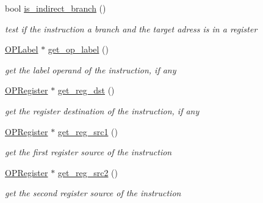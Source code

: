 \begin{DoxyCompactItemize}
\mbox{\label{class_instruction_affdf2382cd36277fb4427cd3b07c1402}} 
bool \mbox{\hyperlink{class_instruction_affdf2382cd36277fb4427cd3b07c1402}{is\+\_\+indirect\+\_\+branch}} ()
\begin{DoxyCompactList}\small\item\em test if the instruction a branch and the target adress is in a register \end{DoxyCompactList}\item 
\mbox{\label{class_instruction_aa32973fb1e9e24659095e4795c153c8a}} 
\mbox{\hyperlink{class_o_p_label}{O\+P\+Label}} $\ast$ \mbox{\hyperlink{class_instruction_aa32973fb1e9e24659095e4795c153c8a}{get\+\_\+op\+\_\+label}} ()
\begin{DoxyCompactList}\small\item\em get the label operand of the instruction, if any \end{DoxyCompactList}\item 
\mbox{\label{class_instruction_adb43e7019987daebb3970335aba695cc}} 
\mbox{\hyperlink{class_o_p_register}{O\+P\+Register}} $\ast$ \mbox{\hyperlink{class_instruction_adb43e7019987daebb3970335aba695cc}{get\+\_\+reg\+\_\+dst}} ()
\begin{DoxyCompactList}\small\item\em get the register destination of the instruction, if any \end{DoxyCompactList}\item 
\mbox{\label{class_instruction_ac353a6ad2b3f3b1aee179d5910b5127b}} 
\mbox{\hyperlink{class_o_p_register}{O\+P\+Register}} $\ast$ \mbox{\hyperlink{class_instruction_ac353a6ad2b3f3b1aee179d5910b5127b}{get\+\_\+reg\+\_\+src1}} ()
\begin{DoxyCompactList}\small\item\em get the first register source of the instruction \end{DoxyCompactList}\item 
\mbox{\label{class_instruction_a0eb007b1b0a038610e71a58af3bb6438}} 
\mbox{\hyperlink{class_o_p_register}{O\+P\+Register}} $\ast$ \mbox{\hyperlink{class_instruction_a0eb007b1b0a038610e71a58af3bb6438}{get\+\_\+reg\+\_\+src2}} ()
\begin{DoxyCompactList}\small\item\em get the second register source of the instruction \end{DoxyCompactList}\item 

\end{DoxyCompactItemize}

